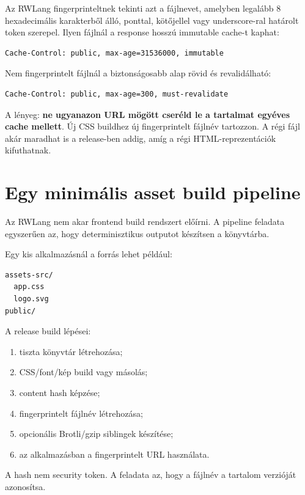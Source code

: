 Az RWLang fingerprinteltnek tekinti azt a fájlnevet, amelyben legalább 8 hexadecimális karakterből álló, ponttal, kötőjellel vagy underscore-ral határolt token szerepel. Ilyen fájlnál a response hosszú immutable cache-t kaphat:

\begin{lstlisting}
Cache-Control: public, max-age=31536000, immutable
\end{lstlisting}

Nem fingerprintelt fájlnál a biztonságosabb alap rövid és revalidálható:

\begin{lstlisting}
Cache-Control: public, max-age=300, must-revalidate
\end{lstlisting}

A lényeg: \textbf{ne ugyanazon URL mögött cseréld le a tartalmat egyéves cache mellett}. Új CSS buildhez új fingerprintelt fájlnév tartozzon. A régi fájl akár maradhat is a release-ben addig, amíg a régi HTML-reprezentációk kifuthatnak.

\section{Egy minimális asset build pipeline}

Az RWLang nem akar frontend build rendszert előírni. A pipeline feladata egyszerűen az, hogy determinisztikus outputot készítsen a  könyvtárba.

Egy kis alkalmazásnál a forrás lehet például:

\begin{lstlisting}
assets-src/
  app.css
  logo.svg
public/
\end{lstlisting}

A release build lépései:

\begin{enumerate}
  \item tiszta  könyvtár létrehozása;
  \item CSS/font/kép build vagy másolás;
  \item content hash képzése;
  \item fingerprintelt fájlnév létrehozása;
  \item opcionális Brotli/gzip siblingek készítése;
  \item az alkalmazásban a fingerprintelt URL használata.
\end{enumerate}

A hash nem security token. A feladata az, hogy a fájlnév a tartalom verzióját azonosítsa.

